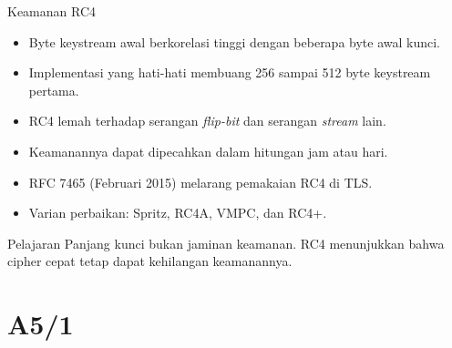 \documentclass[aspectratio=169,11pt]{beamer}
\begin{document}
\begin{frame}{Keamanan RC4}
    \footnotesize
    \begin{itemize}
        \item Byte keystream awal berkorelasi tinggi dengan beberapa byte
              awal kunci.
        \item Implementasi yang hati-hati membuang 256 sampai 512 byte
              keystream pertama.
        \item RC4 lemah terhadap serangan \textit{flip-bit} dan serangan
              \textit{stream} lain.
        \item Keamanannya dapat dipecahkan dalam hitungan jam atau hari.
        \item RFC 7465 (Februari 2015) melarang pemakaian RC4 di TLS.
        \item Varian perbaikan: Spritz, RC4A, VMPC, dan RC4+.
    \end{itemize}
    \begin{alertblock}{Pelajaran}
        Panjang kunci bukan jaminan keamanan. RC4 menunjukkan bahwa cipher
        cepat tetap dapat kehilangan keamanannya.
    \end{alertblock}
\end{frame}

\section{A5/1}
\end{document}
